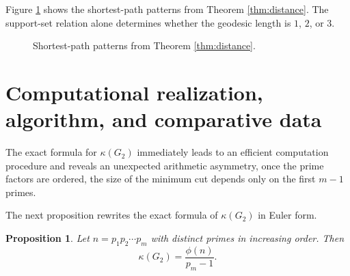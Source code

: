 \documentclass[12pt]{article}
\newtheorem{proposition}[theorem]{Proposition}
\theoremstyle{definition}
\begin{document}
	Figure \ref{fig:distancecases} shows the shortest-path patterns from Theorem \ref{thm:distance}. The support-set relation alone determines whether the geodesic length is $1$, $2$, or $3$.
	\begin{figure}[H]
		\centering
		\vspace*{-2mm}
		\caption{Shortest-path patterns from Theorem \ref{thm:distance}.}
		\label{fig:distancecases}
	\end{figure}
	
	\section{Computational realization, algorithm, and comparative data}\label{sec:algorithmic}
	 The exact formula for $\kappa(G_2)$ immediately leads to an efficient computation procedure and reveals an unexpected arithmetic asymmetry, once the prime factors are ordered, the size of the minimum cut depends only on the first $m-1$ primes.
	
	\medskip
	The next proposition rewrites the exact formula of $\kappa(G_2)$ in Euler form.	
	\begin{proposition}\label{prop:eulerform}
		Let $n=p_1p_2\cdots p_m$ with distinct primes in increasing order. Then
		$$
		\kappa(G_2)=\frac{\phi(n)}{p_m-1}.
		$$
	\end{proposition}
	
\end{document}

